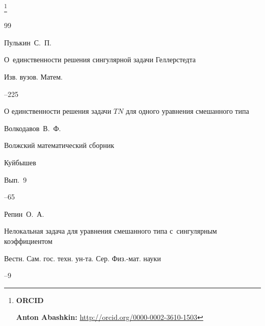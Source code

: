 \thanks{{\bf ORCID}



{\bf Anton Abashkin:} \url{http://orcid.org/0000-0002-3610-1503}

}



\RusRef





\begin{thebibliography}{99}




\by Пулькин~С.~П.

\paper О~единственности решения сингулярной задачи Геллерстедта

\jour Изв. вузов. Матем.



--225







\paper О единственности решения задачи $TN$ для одного уравнения смешанного типа

\by Волкодавов~В.~Ф.

\inbook Волжский математический сборник

\publaddr Куйбышев

\volinfo Вып.~9


--65










\by Репин~О.~А.

\paper Нелокальная задача для уравнения смешанного типа с~сингулярным коэффициентом

\jour  Вестн. Сам. гос. техн. ун-та. Сер. Физ.-мат. науки



--9



\end{thebibliography}
